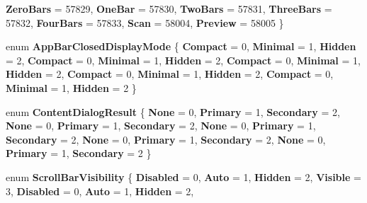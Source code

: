 \begin{DoxyCompactItemize}
{\bfseries Zero\+Bars} = 57829, 
{\bfseries One\+Bar} = 57830, 
\newline
{\bfseries Two\+Bars} = 57831, 
{\bfseries Three\+Bars} = 57832, 
{\bfseries Four\+Bars} = 57833, 
{\bfseries Scan} = 58004, 
\newline
{\bfseries Preview} = 58005
 \}
\item 
\mbox{\label{namespace_windows_1_1_u_i_1_1_xaml_1_1_controls_a69ed41c1bfc769995c091035ab6dd837}} 
enum {\bfseries App\+Bar\+Closed\+Display\+Mode} \{ \newline
{\bfseries Compact} = 0, 
{\bfseries Minimal} = 1, 
{\bfseries Hidden} = 2, 
{\bfseries Compact} = 0, 
\newline
{\bfseries Minimal} = 1, 
{\bfseries Hidden} = 2, 
{\bfseries Compact} = 0, 
{\bfseries Minimal} = 1, 
\newline
{\bfseries Hidden} = 2, 
{\bfseries Compact} = 0, 
{\bfseries Minimal} = 1, 
{\bfseries Hidden} = 2, 
\newline
{\bfseries Compact} = 0, 
{\bfseries Minimal} = 1, 
{\bfseries Hidden} = 2
 \}
\item 
\mbox{\label{namespace_windows_1_1_u_i_1_1_xaml_1_1_controls_aeb84959a5f71279742b9e779903775a6}} 
enum {\bfseries Content\+Dialog\+Result} \{ \newline
{\bfseries None} = 0, 
{\bfseries Primary} = 1, 
{\bfseries Secondary} = 2, 
{\bfseries None} = 0, 
\newline
{\bfseries Primary} = 1, 
{\bfseries Secondary} = 2, 
{\bfseries None} = 0, 
{\bfseries Primary} = 1, 
\newline
{\bfseries Secondary} = 2, 
{\bfseries None} = 0, 
{\bfseries Primary} = 1, 
{\bfseries Secondary} = 2, 
\newline
{\bfseries None} = 0, 
{\bfseries Primary} = 1, 
{\bfseries Secondary} = 2
 \}
\item 
\mbox{\label{namespace_windows_1_1_u_i_1_1_xaml_1_1_controls_a001a76f53e0cb6e7acfde3aeca1adf39}} 
enum {\bfseries Scroll\+Bar\+Visibility} \{ \newline
{\bfseries Disabled} = 0, 
{\bfseries Auto} = 1, 
{\bfseries Hidden} = 2, 
{\bfseries Visible} = 3, 
\newline
{\bfseries Disabled} = 0, 
{\bfseries Auto} = 1, 
{\bfseries Hidden} = 2, 

\end{DoxyCompactItemize}

